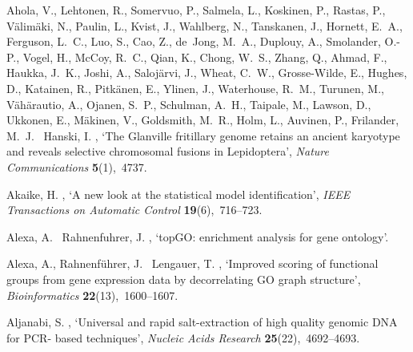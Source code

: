 \documentclass[twocolumn]{bmcart}%
\begin{document}
\begin{backmatter}
\begin{thebibliography}{xx}
Ahola, V., Lehtonen, R., Somervuo, P., Salmela, L., Koskinen, P., Rastas, P.,
  Välimäki, N., Paulin, L., Kvist, J., Wahlberg, N., Tanskanen, J., Hornett,
  E.~A., Ferguson, L.~C., Luo, S., Cao, Z., de~Jong, M.~A., Duplouy, A.,
  Smolander, O.-P., Vogel, H., McCoy, R.~C., Qian, K., Chong, W.~S., Zhang, Q.,
  Ahmad, F., Haukka, J.~K., Joshi, A., Salojärvi, J., Wheat, C.~W.,
  Grosse-Wilde, E., Hughes, D., Katainen, R., Pitkänen, E., Ylinen, J.,
  Waterhouse, R.~M., Turunen, M., Vähärautio, A., Ojanen, S.~P., Schulman,
  A.~H., Taipale, M., Lawson, D., Ukkonen, E., Mäkinen, V., Goldsmith, M.~R.,
  Holm, L., Auvinen, P., Frilander, M.~J. \harvardand\ Hanski, I.
  \harvardyearright , `The {{Glanville}} fritillary genome
  retains an ancient karyotype and reveals selective chromosomal fusions in
  {{Lepidoptera}}', {\em Nature Communications} {\bf 5}(1),~4737.

Akaike, H.  \harvardyearright , `A new look at the
  statistical model identification', {\em IEEE Transactions on Automatic
  Control} {\bf 19}(6),~716--723.

Alexa, A. \harvardand\ Rahnenfuhrer, J.  \harvardyearright
  , `{{topGO}}: enrichment analysis for gene ontology'.

Alexa, A., Rahnenführer, J. \harvardand\ Lengauer, T.  \harvardyearleft
  2006\harvardyearright , `Improved scoring of functional groups from gene
  expression data by decorrelating {{GO}} graph structure', {\em
  Bioinformatics} {\bf 22}(13),~1600--1607.

Aljanabi, S.  \harvardyearright , `Universal and rapid
  salt-extraction of high quality genomic {{DNA}} for {{PCR-}} based
  techniques', {\em Nucleic Acids Research} {\bf 25}(22),~4692--4693.


\end{thebibliography}
\end{backmatter}
\end{document}
